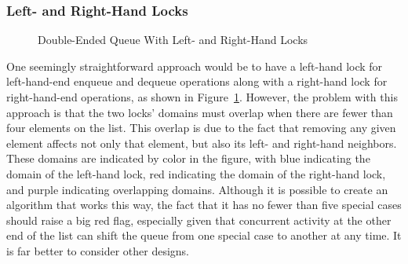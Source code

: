 \subsubsection{Left- and Right-Hand Locks}
\label{sec:SMPdesign:Left- and Right-Hand Locks}

\begin{figure}[tb]
\begin{center}
\end{center}
\caption{Double-Ended Queue With Left- and Right-Hand Locks}
\label{fig:SMPdesign:Double-Ended Queue With Left- and Right-Hand Locks}
\end{figure}

One seemingly straightforward approach would be to have a left-hand lock
for left-hand-end enqueue and dequeue operations along with a right-hand
lock for right-hand-end operations, as shown in
Figure~\ref{fig:SMPdesign:Double-Ended Queue With Left- and Right-Hand Locks}.
However, the problem with this approach is that the two locks'
domains must overlap when there are fewer than four elements on the
list.
This overlap is due to the fact that removing any given element affects
not only that element, but also its left- and right-hand neighbors.
These domains are indicated by color in the figure, with blue indicating
the domain of the left-hand lock, red indicating the domain of the right-hand
lock, and purple indicating overlapping domains.
Although it is possible to create an algorithm that works this way,
the fact that it has no fewer than five special cases should raise
a big red flag, especially given that concurrent activity at the other
end of the list can shift the queue from one special case to another
at any time.
It is far better to consider other designs.

